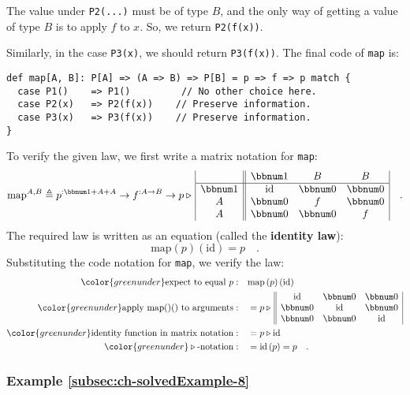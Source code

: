 The value under \lstinline!P2(...)! must be of type $B$, and the
only way of getting a value of type $B$ is to apply $f$ to $x$.
So, we return \lstinline!P2(f(x))!.

Similarly, in the case \lstinline!P3(x)!, we should return \lstinline!P3(f(x))!.
The final code of \lstinline!map! is:
\begin{lstlisting}
def map[A, B]: P[A] => (A => B) => P[B] = p => f => p match {
  case P1()    => P1()         // No other choice here.
  case P2(x)   => P2(f(x))    // Preserve information.
  case P3(x)   => P3(f(x))    // Preserve information.
}
\end{lstlisting}

To verify the given law, we first write a matrix notation for \lstinline!map!:
\[
\text{map}^{A,B}\triangleq p^{:\bbnum 1+A+A}\rightarrow f^{:A\rightarrow B}\rightarrow p\triangleright\,\begin{array}{|c||ccc|}
 & \bbnum 1 & B & B\\
\hline \bbnum 1 & \text{id} & \bbnum 0 & \bbnum 0\\
A & \bbnum 0 & f & \bbnum 0\\
A & \bbnum 0 & \bbnum 0 & f
\end{array}\quad.
\]
The required law is written as an equation (called the
\textbf{identity law}):
\[
\text{map}\left(p\right)(\text{id})=p\quad.
\]
Substituting the code notation for \lstinline!map!, we verify the
law:
\begin{align*}
{\color{greenunder}\text{expect to equal }p:}\quad & \text{map}\left(p\right)(\text{id})\\
{\color{greenunder}\text{apply map()() to arguments}:}\quad & =p\triangleright\,\begin{array}{||ccc|}
\text{id} & \bbnum 0 & \bbnum 0\\
\bbnum 0 & \text{id} & \bbnum 0\\
\bbnum 0 & \bbnum 0 & \text{id}
\end{array}\\
{\color{greenunder}\text{identity function in matrix notation}:}\quad & =p\triangleright\text{id}\\
{\color{greenunder}\triangleright\text{-notation}:}\quad & =\text{id}\left(p\right)=p\quad.
\end{align*}


\subsubsection{Example \label{subsec:ch-solvedExample-8}\ref{subsec:ch-solvedExample-8}}

